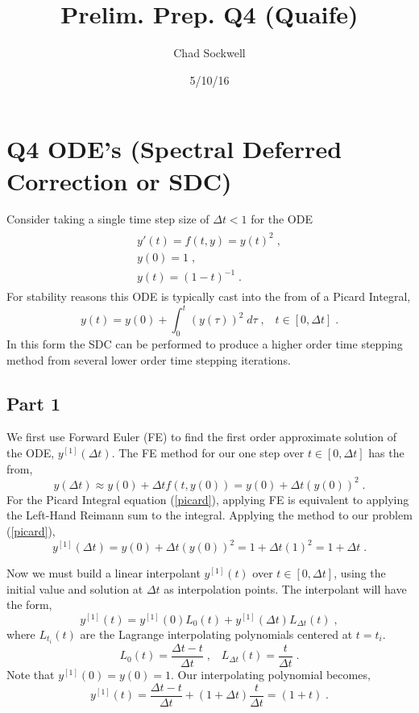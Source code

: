 \documentclass[11pt,oneside,a4paper]{article}
\begin{document}
\title{Prelim. Prep. Q4 (Quaife)}
\author{Chad Sockwell}
\date{5/10/16}
\maketitle

\section{Q4 ODE's (Spectral Deferred Correction or SDC)}
Consider taking a single time step size of $\Delta t<1$ for the ODE 
\begin{align} \label{prob}
\begin{gathered}
y'(t)=f(t,y)=y(t)^2\;, \\
y(0)=1\;,\\
y(t)=(1-t)^{-1}\;.
\end{gathered}
\end{align} 
For stability reasons this ODE is typically cast into the from of a Picard Integral,
\begin{equation}\label{picard}
y(t)=y(0)+\int_0^t(y(\tau))^2\;d\tau\;,\;\;\;t\in[0,\Delta t]\;.
\end{equation}
In this form the SDC can be performed to produce a higher order time stepping method from several lower order time stepping iterations. 
\subsection{Part 1}
We first use Forward Euler (FE) to find the first order approximate solution of the ODE, $y^{[1]}(\Delta t)$. The FE method for our one step over $t\in[0,\Delta t]$ has the from, 
\begin{equation}
y(\Delta t)\approx y(0)+\Delta t f(t,y(0))=y(0)+\Delta t (y(0))^2\;.
\end{equation}
For the Picard Integral equation (\ref{picard}), applying FE is equivalent to applying the Left-Hand Reimann sum to the integral. Applying the method to our problem (\ref{picard}),
\begin{equation}
y^{[1]}(\Delta t)=y(0)+\Delta t (y(0))^2=1+\Delta t(1)^2=1+\Delta t\;.
\end{equation} 

Now we must build a linear interpolant $y^{[1]}(t)$ over $t\in[0,\Delta t]$, using the initial value and solution at $\Delta t$ as interpolation points. The interpolant will have the form,
\begin{equation}
y^{[1]}(t)=y^{[1]}(0)L_0(t)+y^{[1]}(\Delta t) L_{\Delta t}(t)\;,
\end{equation}
where $L_{t_i}(t)$ are the Lagrange interpolating polynomials centered at $t={t_i}$.
\begin{equation}
L_0(t)=\frac{\Delta t-t}{\Delta t}\;,\;\;\; L_{\Delta t}(t)=\frac{t}{\Delta t}\;.
\end{equation}
Note that $y^{[1]}(0)=y(0)=1$.
Our interpolating polynomial becomes,
\begin{equation}\label{interp}
y^{[1]}(t)=\frac{\Delta t-t}{\Delta t}+(1+\Delta t)\frac{t}{\Delta t}=(1+t)\;.
\end{equation} 
\end{document}
